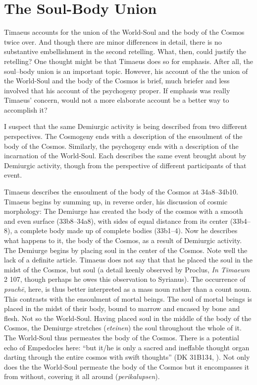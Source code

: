 
\section{The Soul-Body Union} %
\label{sec:the_embodiment_of_the_world_soul}

Timaeus accounts for the union of the World-Soul and the body of the Cosmos twice over. And though there are minor differences in detail, there is no substantive embellishment in the second retelling. What, then, could justify the retelling? One thought might be that Timaeus does so for emphasis. After all, the soul--body union is an important topic. However, his account of the the union of the World-Soul and the body of the Cosmos is brief, much briefer and less involved that his account of the psychogeny proper. If emphasis was really Timaeus' concern, would not a more elaborate account be a better way to accomplish it? 

I suspect that the same Demiurgic activity is being described from two different perspectives. The Cosmogeny ends with a description of the ensoulment of the body of the Cosmos. Similarly, the psychogeny ends with a description of the incarnation of the World-Soul. Each describes the same event brought about by Demiurgic activity, though from the perspective of different participants of that event.

Timaeus describes the ensoulment of the body of the Cosmos at 34a8--34b10. Timae\-us begins by summing up, in reverse order, his discussion of cosmic morphology: The Demiurge has created the body of the cosmos with a smooth and even surface (33b8--34a8), with sides of equal distance from its center (33b4--8), a complete body made up of complete bodies (33b1--4). Now he describes what happens to it, the body of the Cosmos, as a result of Demiurgic activity. The Demiurge begins by placing soul in the center of the Cosmos. Note well the lack of a definite article. Timaeus does not say that that he placed the soul in the midst of the Cosmos, but soul (a detail keenly observed by Proclus, \emph{In Timaeum} 2 107, though perhaps he owes this observation to Syrianus). The occurrence of \emph{psuchē}, here, is thus better interpreted as a mass noun rather than a count noun. This contrasts with the ensoulment of mortal beings. The soul of mortal beings is placed in the midst of their body, bound to marrow and encased by bone and flesh. Not so the World-Soul. Having placed soul in the middle of the body of the Cosmos, the Demiurge stretches (\emph{eteinen}) the soul throughout the whole of it. The World-Soul thus permeates the body of the Cosmos. There is a potential echo of Empedocles here: ``but it/he is only a sacred and ineffable thought organ darting through the entire cosmos with swift thoughts'' (DK 31B134, \citealt[263]{Inwood:2001ve}). Not only does the the World-Soul permeate the body of the Cosmos but it encompasses it from without, covering it all around (\emph{perikalupsen}). 

